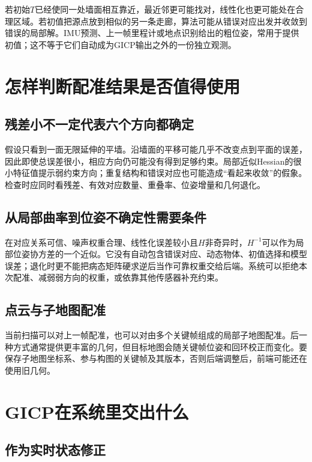 若初始$T$已经使同一处墙面相互靠近，最近邻更可能找对，线性化也更可能处在合理区域。若初值把源点放到相似的另一条走廊，算法可能从错误对应出发并收敛到错误的局部解。IMU预测、上一帧里程计或地点识别给出的粗位姿，常用于提供初值；这不等于它们自动成为GICP输出之外的一份独立观测。

\section{怎样判断配准结果是否值得使用}

\subsection{残差小不一定代表六个方向都确定}

假设只看到一面无限延伸的平墙。沿墙面的平移可能几乎不改变点到平面的误差，因此即使总误差很小，相应方向仍可能没有得到足够约束。局部近似Hessian的很小特征值提示弱约束方向；重复结构和错误对应也可能造成“看起来收敛”的假象。检查时应同时看残差、有效对应数量、重叠率、位姿增量和几何退化。

\subsection{从局部曲率到位姿不确定性需要条件}

在对应关系可信、噪声权重合理、线性化误差较小且$H$非奇异时，$H^{-1}$可以作为局部位姿协方差的一个近似。它没有自动包含错误对应、动态物体、初值选择和模型误差；退化时更不能把病态矩阵硬求逆后当作可靠权重交给后端。系统可以拒绝本次配准、减弱弱方向的权重，或依靠其他传感器补充约束。

\subsection{点云与子地图配准}

当前扫描可以对上一帧配准，也可以对由多个关键帧组成的局部子地图配准。后一种方式通常提供更丰富的几何，但目标地图会随关键帧位姿和回环校正而变化。要保存子地图坐标系、参与构图的关键帧及其版本，否则后端调整后，前端可能还在使用旧几何。

\section{GICP在系统里交出什么}

\subsection{作为实时状态修正}

